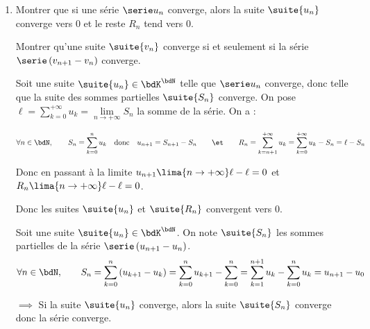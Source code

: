 \documentclass[a4paper,french,bookmarks]{article}
\begin{document}
\begin{enumerate}
    \item Montrer que si une série $\serie u_n$ converge, alors la suite $\suite{u_n}$ converge vers $0$ et le reste $R_n$ tend vers $0$.
    
    Montrer qu'une suite $\suite{v_n}$ converge si et seulement si la série $\serie \left(v_{n+1} - v_n\right)$ converge.
    
    \noafter
    \nobefore
    \begin{nproof}
        Soit une suite $\suite{u_n} \in \bdK^\bdN$ telle que $\serie u_n$ converge, donc telle que la suite des sommes partielles $\suite{S_n}$ converge. On pose $\ell = \sum\limits_{k=0}^{+\infty} u_k = \lim\limits_{n \to +\infty} S_n$ la somme de la série. On a :
        \begin{center}
            \( \displaystyle \forall n \in \bdN,\qquad S_n = \sum_{k=0}^{n} u_k \quad \text{donc}\quad u_{n+1} = S_{n+1} - S_n \qquad\et\qquad R_n = \sum_{k=n+1}^{+\infty} u_k = \sum_{k=0}^{+\infty} u_k - S_n = \ell - S_n \)
        \end{center}
        Donc en passant à la limite $u_{n+1} \lima{n \to +\infty} \ell - \ell = 0$ et $R_n \lima{n \to +\infty} \ell - \ell = 0$.
        
        Donc les suites $\suite{u_n}$ et $\suite{R_n}$ convergent vers $0$.
    \end{nproof}
    \yesafter
    \begin{nproof}
        Soit une suite $\suite{u_n} \in \bdK^\bdN$. On note $\suite{S_n}$ les sommes partielles de la série $\serie \left(u_{n+1} - u_n\right)$.
        \[ \forall n \in \bdN,\qquad S_n = \sum_{k=0}^n \left(u_{k+1} - u_k\right) = \sum_{k=0}^n u_{k+1} - \sum_{k=0}^n = \sum_{k=1}^{n+1} u_k - \sum_{k=0}^n u_k = u_{n+1} - u_0 \]
        \begin{enumerate}
            \itt $\boxed{\implies}$ Si la suite $\suite{u_n}$ converge, alors la suite $\suite{S_n}$ converge donc la série converge.
            

\end{enumerate}
\end{nproof}
\end{enumerate}
\end{document}
